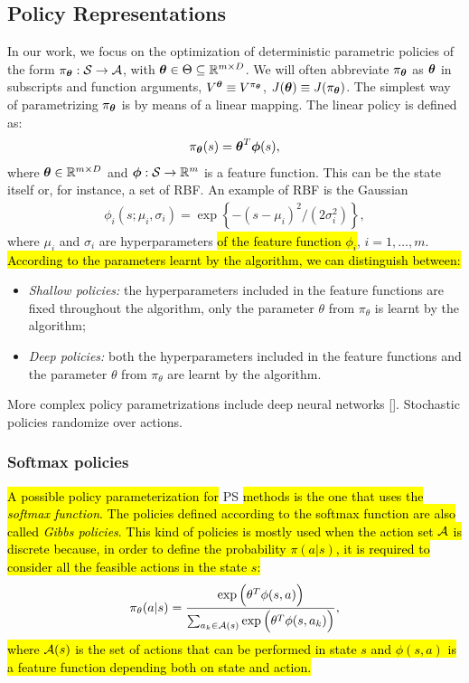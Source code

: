 \subsection{Policy Representations} \label{subsec:polrep}
In our work, we focus on the optimization of deterministic parametric policies of the form $\pi_{\boldsymbol{\theta}}:\mathcal{S}\to\mathcal{A}$, with $\boldsymbol{\theta}\in\Theta\subseteq\mathbb{R}^{m\times D}$. We will often abbreviate $\pi_{\boldsymbol{\theta}}$ as $\boldsymbol{\theta}$ in subscripts and function arguments, \eg $V^{\boldsymbol{\theta}} \equiv V^{\pi_{\boldsymbol{\theta}}}$, $J(\boldsymbol{\theta}) \equiv J(\pi_{\boldsymbol{\theta}})$. The simplest way of parametrizing $\pi_{\boldsymbol{\theta}}$ is by means of a linear mapping. The linear policy is defined as:
\begin{align} \pi_{\boldsymbol{\theta}}(s) = \boldsymbol{\theta}^T\boldsymbol{\phi}(s), \end{align} where $\boldsymbol{\theta}\in\mathbb{R}^{m\times D}$ and $\boldsymbol{\phi}:\mathcal{S}\to\mathbb{R}^m$ is a feature function. This can be the state itself or, for instance, a set of \acf{RBF}. An example of RBF is the Gaussian
\begin{align} \phi_i(s; \mu_i, \sigma_i) = \exp\left\{-{(s -\mu_i)^2}\big/{(2\sigma_i^2)}\right\}, \end{align}
where $\mu_i$ and $\sigma_i$ are hyperparameters \hl{of the feature function $\phi_i$}, $i=1,\dots,m$. \hl{According to the parameters learnt by the algorithm, we can distinguish between:}
\begin{itemize}
	\item \emph{Shallow policies: }the hyperparameters included in the feature functions are fixed throughout the algorithm, only the parameter $\theta$ from $\pi_{\theta}$ is learnt by the algorithm;
	\item \emph{Deep policies: }both the hyperparameters included in the feature functions and the parameter $\theta$ from $\pi_{\theta}$ are learnt by the algorithm. 
\end{itemize}
More complex policy parametrizations include deep neural networks [\cite{duan2016benchmarking}]. 
Stochastic policies randomize over actions. %

\subsubsection{Softmax policies}
\hl{A possible policy parameterization for} \ac{PS} \hl{methods is the one that uses the \emph{softmax function}. The policies defined according to the softmax function are also called \emph{Gibbs policies}. This kind of policies is mostly used when the action set $\mathcal{A}$ is discrete because, in order to define the probability $\pi(a|s)$, it is required to consider all the feasible actions in the state $s$:}
\begin{align}
\pi_{\theta}(a|s) = \frac{\exp\Big(\theta^{T}\phi(s,a)\Big)}{\sum_{a_{k} \in \mathcal{A}(s)}\exp\Big(\theta^{T}\phi(s,a_{k})\Big)},
\end{align}
\hl{where $\mathcal{A}(s)$ is the set of actions that can be performed in state $s$ and $\phi(s,a)$ is a feature function depending both on state and action.}

